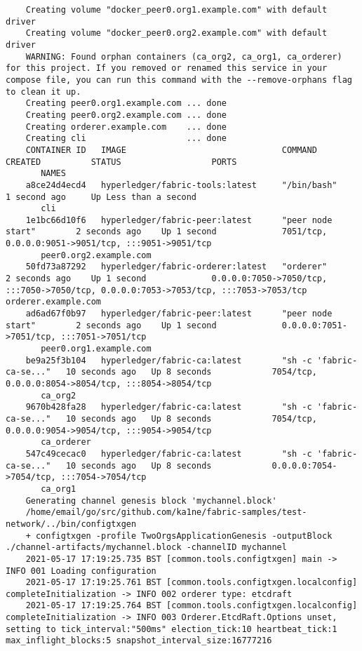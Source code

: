 \begin{lstlisting}
    Creating volume "docker_peer0.org1.example.com" with default driver
    Creating volume "docker_peer0.org2.example.com" with default driver
    WARNING: Found orphan containers (ca_org2, ca_org1, ca_orderer) for this project. If you removed or renamed this service in your compose file, you can run this command with the --remove-orphans flag to clean it up.
    Creating peer0.org1.example.com ... done
    Creating peer0.org2.example.com ... done
    Creating orderer.example.com    ... done
    Creating cli                    ... done
    CONTAINER ID   IMAGE                               COMMAND                  CREATED          STATUS                  PORTS
       NAMES
    a8ce24d4ecd4   hyperledger/fabric-tools:latest     "/bin/bash"              1 second ago     Up Less than a second
       cli
    1e1bc66d10f6   hyperledger/fabric-peer:latest      "peer node start"        2 seconds ago    Up 1 second             7051/tcp, 0.0.0.0:9051->9051/tcp, :::9051->9051/tcp
       peer0.org2.example.com
    50fd73a87292   hyperledger/fabric-orderer:latest   "orderer"                2 seconds ago    Up 1 second             0.0.0.0:7050->7050/tcp, :::7050->7050/tcp, 0.0.0.0:7053->7053/tcp, :::7053->7053/tcp   orderer.example.com
    ad6ad67f0b97   hyperledger/fabric-peer:latest      "peer node start"        2 seconds ago    Up 1 second             0.0.0.0:7051->7051/tcp, :::7051->7051/tcp
       peer0.org1.example.com
    be9a25f3b104   hyperledger/fabric-ca:latest        "sh -c 'fabric-ca-se..."   10 seconds ago   Up 8 seconds            7054/tcp, 0.0.0.0:8054->8054/tcp, :::8054->8054/tcp
       ca_org2
    9670b428fa28   hyperledger/fabric-ca:latest        "sh -c 'fabric-ca-se..."   10 seconds ago   Up 8 seconds            7054/tcp, 0.0.0.0:9054->9054/tcp, :::9054->9054/tcp
       ca_orderer
    547c49cecac0   hyperledger/fabric-ca:latest        "sh -c 'fabric-ca-se..."   10 seconds ago   Up 8 seconds            0.0.0.0:7054->7054/tcp, :::7054->7054/tcp
       ca_org1
    Generating channel genesis block 'mychannel.block'
    /home/email/go/src/github.com/ka1ne/fabric-samples/test-network/../bin/configtxgen
    + configtxgen -profile TwoOrgsApplicationGenesis -outputBlock ./channel-artifacts/mychannel.block -channelID mychannel
    2021-05-17 17:19:25.735 BST [common.tools.configtxgen] main -> INFO 001 Loading configuration
    2021-05-17 17:19:25.761 BST [common.tools.configtxgen.localconfig] completeInitialization -> INFO 002 orderer type: etcdraft
    2021-05-17 17:19:25.764 BST [common.tools.configtxgen.localconfig] completeInitialization -> INFO 003 Orderer.EtcdRaft.Options unset, setting to tick_interval:"500ms" election_tick:10 heartbeat_tick:1 max_inflight_blocks:5 snapshot_interval_size:16777216

\end{lstlisting}
